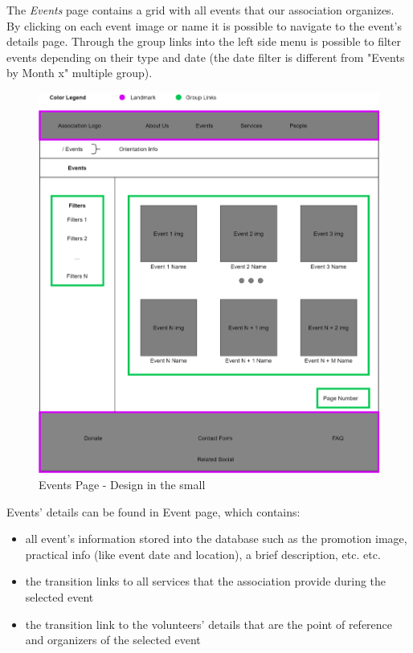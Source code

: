 The \emph{Events} page contains a grid with all events that our association organizes.  By clicking on each event image or name it is possible to navigate to the event's details page. Through the group links into the left side menu is possible to filter events depending on their type and date (the date filter is different from "Events by Month x" multiple group).

\begin{figure}[h!]
		\centering
		\begin{minipage}[b]{1\textwidth}
    			\includegraphics[width=\textwidth]{./assets/events.png}
			\caption{Events Page - Design in the small}
		\end{minipage}
	\end{figure}
\FloatBarrier 
\vspace{1cm}
\hspace{-1cm}
Events' details can be found in Event page, which contains:
\begin{itemize}
	\item all event's information stored into the database such as the promotion image, practical info (like event date and location),  			a brief description, etc. etc.
	\item the transition links to all services that the association provide during the selected event
	\item the transition link to the volunteers' details that are the point of reference and organizers of the selected event
\end{itemize} 

